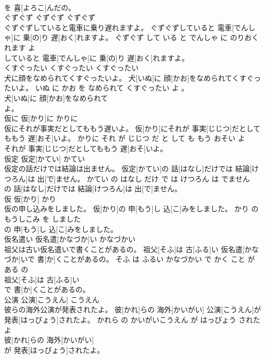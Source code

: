 \documentclass[8pt]{extreport}
\begin{document}
\begin{CJK}{UTF8}{min}
\\	を 喜[よろこ]んだの。			
\\	ぐずぐず	ぐずぐず	ぐずぐず	
\\	ぐずぐずしていると電車に乗り遅れますよ。	ぐずぐずしていると 電車[でんしゃ]に 乗[の]り 遅[おく]れますよ。	ぐずぐず して いる と でんしゃ に のりおくれます よ	
\\	していると 電車[でんしゃ]に 乗[の]り 遅[おく]れますよ。			
\\	くすぐったい	くすぐったい	くすぐったい	
\\	犬に顔をなめられてくすぐったいよ。	犬[いぬ]に 顔[かお]をなめられてくすぐったいよ。	いぬ に かお を なめられて くすぐったい よ 。	
\\	犬[いぬ]に 顔[かお]をなめられて
\\	よ。			
\\	仮に	仮[かり]に	かりに	
\\	仮にそれが事実だとしてももう遅いよ。	仮[かり]にそれが 事実[じじつ]だとしてももう 遅[おそ]いよ。	かりに それ が じじつ だ と して も もう おそい よ	
\\	それが 事実[じじつ]だとしてももう 遅[おそ]いよ。			
\\	仮定	仮定[かてい]	かてい	
\\	仮定の話だけでは結論は出ません。	仮定[かてい]の 話[はなし]だけでは 結論[けつろん]は 出[で]ません。	かてい の はなし だけ で は けつろん は でません	
\\	の 話[はなし]だけでは 結論[けつろん]は 出[で]ません。			
\\	仮	仮[かり]	かり	
\\	仮の申し込みをしました。	仮[かり]の 申[もう]し 込[こ]みをしました。	かり の もうしこみ を しました	
\\	の 申[もう]し 込[こ]みをしました。			
\\	仮名遣い	仮名遣[かなづか]い	かなづかい	
\\	祖父は古い仮名遣いで書くことがあるの。	祖父[そふ]は 古[ふる]い 仮名遣[かなづか]いで 書[か]くことがあるの。	そふ は ふるい かなづかい で かく こと が ある の	
\\	祖父[そふ]は 古[ふる]い
\\	で 書[か]くことがあるの。			
\\	公演	公演[こうえん]	こうえん	
\\	彼らの海外公演が発表されたよ。	彼[かれ]らの 海外[かいがい] 公演[こうえん]が 発表[はっぴょう]されたよ。	かれら の かいがいこうえん が はっぴょう された よ	
\\	彼[かれ]らの 海外[かいがい]
\\	が 発表[はっぴょう]されたよ。			

\end{CJK}
\end{document}
